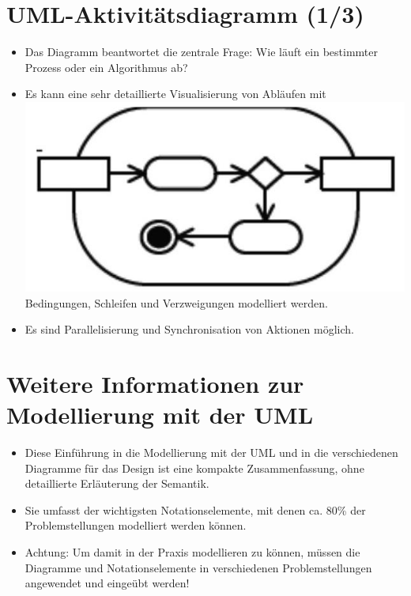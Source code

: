 \documentclass[10pt]{article}
\begin{document}
\section*{UML-Aktivitätsdiagramm (1/3)}
\begin{itemize}
  \item Das Diagramm beantwortet die zentrale Frage: Wie läuft ein bestimmter Prozess oder ein Algorithmus ab?
  \item Es kann eine sehr detaillierte Visualisierung von Abläufen mit\\
\includegraphics[max width=\textwidth]{2025_01_02_787afb9584031d2940deg-18} Bedingungen, Schleifen und Verzweigungen modelliert werden.
  \item Es sind Parallelisierung und Synchronisation von Aktionen möglich.
\end{itemize}

\section*{Weitere Informationen zur Modellierung mit der UML}
\begin{itemize}
  \item Diese Einführung in die Modellierung mit der UML und in die verschiedenen Diagramme für das Design ist eine kompakte Zusammenfassung, ohne detaillierte Erläuterung der Semantik.
  \item Sie umfasst der wichtigsten Notationselemente, mit denen ca. 80\% der Problemstellungen modelliert werden können.
  \item Achtung: Um damit in der Praxis modellieren zu können, müssen die Diagramme und Notationselemente in verschiedenen Problemstellungen angewendet und eingeübt werden!
\end{itemize}
\end{document}
